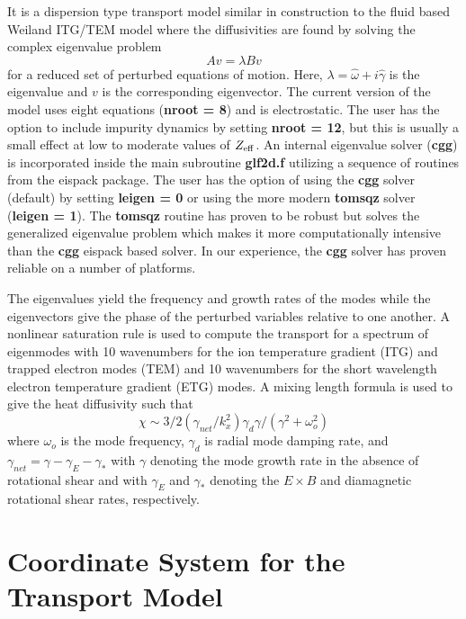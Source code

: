 It is a dispersion type transport model similar in construction 
to the fluid based Weiland ITG/TEM model where the diffusivities
are found by solving the complex eigenvalue problem
\[ A v = \lambda B v \] for a reduced set of perturbed
equations of motion. Here, $ \lambda = \hat{\omega} + 
i \hat{\gamma} $ is the eigenvalue and $ v $ is the corresponding 
eigenvector. The current version of the model uses eight equations 
({\bf nroot = 8}) and is electrostatic. The user has the option
to include impurity dynamics by setting {\bf nroot = 12}, but
this is usually a small effect at low to moderate values of $Z_{\rm eff}$.
An internal eigenvalue solver ({\bf cgg}) is incorporated 
inside the main subroutine {\bf glf2d.f} utilizing a sequence of routines 
from the eispack package. The user has the option of using the
{\bf cgg} solver (default) by setting {\bf leigen = 0} or using the more
modern {\bf tomsqz} solver ({\bf leigen = 1}).
The {\bf tomsqz} routine has proven to be robust but solves
the generalized eigenvalue problem which makes it more computationally
intensive than the {\bf cgg} eispack based solver. In our
experience, the {\bf cgg} solver has proven reliable on
a number of platforms.

The eigenvalues yield the frequency and growth rates 
of the modes while the eigenvectors give the phase of the perturbed
variables relative to one another. 
A nonlinear saturation rule is used to compute the transport
for a spectrum of eigenmodes with 10 wavenumbers for the ion
temperature gradient (ITG) and trapped electron modes (TEM)
and 10 wavenumbers for the short wavelength electron temperature
gradient (ETG) modes. A mixing length formula is used
to give the heat diffusivity such that \[ \chi \sim 3/2 (\gamma_{net}/k_x^2)
\gamma_d \gamma / (\gamma^2 + \omega_o^2) \] where 
$\omega_o$ is the mode frequency, $\gamma_d$ is radial mode
damping rate, and $\gamma_{net}
=\gamma - \gamma_E - \gamma_*$ with $\gamma$ denoting the mode growth
rate in the absence of rotational shear and with $\gamma_E$ and 
$\gamma_*$ denoting the $E \times B$ and diamagnetic rotational 
shear rates, respectively.\\

\section{Coordinate System for the Transport Model}

